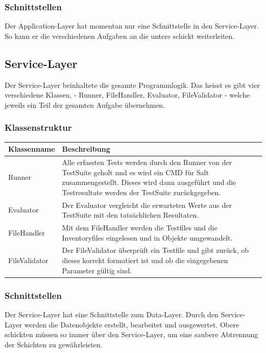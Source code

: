 \documentclass[a4,12pt]{scrartcl}
\begin{document}
\subsubsection{Schnittstellen}
Der Application-Layer hat momentan nur eine Schnittstelle in den Service-Layer. So kann er die verschiedenen Aufgaben an die untere schickt weiterleiten.



\subsection{Service-Layer}
Der Service-Layer beinhaltete die gesamte Programmlogik. Das heisst es gibt vier verschiedene Klassen, - Runner, FileHandler, Evaluator, FileValidator - welche jeweils ein Teil der gesamten Aufgabe übernehmen.
\subsubsection{Klassenstruktur}
\begin{table}[H]
\centering
    \begin{tabular}{@{}l p{11cm} @{}}\toprule    
    {Klassenname} & {Beschreibung}\\ \midrule
    
    Runner & Alle erfassten Tests werden durch den Runner von der TestSuite geholt und es wird ein CMD für Salt zusammengestellt. Dieses wird dann ausgeführt und die Testresultate werden der TestSuite zurückgegeben.  \\       
    Evaluator & Der Evaluator vergleicht die erwarteten Werte aus der TestSuite mit den tatsächlichen Resultaten. \\
    FileHandler & Mit dem FileHandler werden die Testfiles und die Inventoryfiles eingelesen und in Objekte umgewandelt.\\
    FileValidator & Der FileValidator überprüft ein Testfile und gibt zurück, ob dieses korrekt formatiert ist und ob die eingegebenen Parameter gültig sind. \\

    \bottomrule
    \end{tabular}
\end{table}
\subsubsection{Schnittstellen}
Der Service-Layer hat eine Schnittstelle zum Data-Layer. Durch den Service-Layer werden die Datenobjekte erstellt, bearbeitet und ausgewertet. Obere schickten müssen so immer über den Service-Layer, um eine saubere Abtrennung der Schichten zu gewährleisten.
\end{document}
